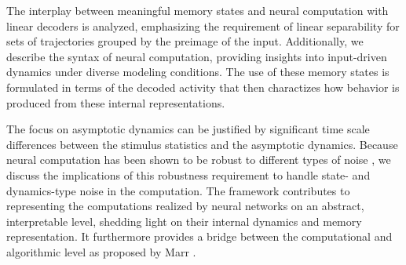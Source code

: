 \documentclass[12pt,letterpaper, onecolumn]{article}
\theoremstyle{definition}
\theoremstyle{remark}
\begin{document}
 The interplay between meaningful memory states and neural computation with linear decoders is analyzed, emphasizing the requirement of linear separability for sets of trajectories grouped by the preimage of the input. 
Additionally, we describe the syntax of neural computation, providing insights into input-driven dynamics under diverse modeling conditions.
The use of these memory states is formulated in terms of the decoded activity that then charactizes how behavior is produced from these internal representations. 


The focus on asymptotic dynamics can be justified by significant time scale differences between the stimulus statistics and the asymptotic dynamics.
Because neural computation has been shown to be robust to different types of noise \cite{Park2023a}, we discuss the implications of this robustness requirement to handle state- and dynamics-type noise in the computation. 
The framework contributes to representing the computations realized by neural networks on an abstract, interpretable level, shedding light on their internal dynamics and memory representation.
It furthermore provides a bridge between the computational and algorithmic level as proposed by Marr \cite{marr2010}.







\printbibliography
\end{document}
